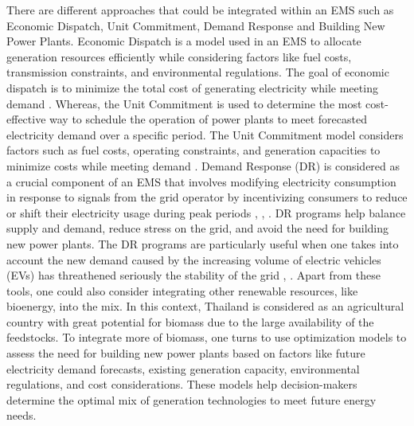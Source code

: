\documentclass[12pt]{report}
\begin{document}
There are different approaches that could be integrated within an EMS such as Economic Dispatch, Unit Commitment, Demand Response and Building New Power Plants. 
Economic Dispatch is a model used in an EMS to allocate generation resources efficiently while considering factors like fuel costs, transmission constraints, and environmental regulations. 
The goal of economic dispatch is to minimize the total cost of generating electricity while meeting demand \cite{Li2022123678}. 
Whereas, the Unit Commitment is used to determine the most cost-effective way to schedule the operation of power plants to meet forecasted electricity demand over a specific period. 
The Unit Commitment model considers factors such as fuel costs, operating constraints, and generation capacities to minimize costs while meeting demand \cite{abdou2018}. 
Demand Response (DR) is considered as a crucial component of an EMS that involves modifying electricity consumption in response to signals from the grid operator by incentivizing consumers to reduce or shift their electricity usage during peak periods \cite{OCONNELL2014686}, \cite{BLASCHKE2022112878}, \cite{HOFMANN2024100126}.
DR programs help balance supply and demand, reduce stress on the grid, and avoid the need for building new power plants.
The DR programs are particularly useful when one takes into account the new demand caused by the increasing volume of electric vehicles (EVs) has threathened seriously the stability of the grid \cite{TUNGOM2024121761}, \cite{SANKARAKUMAR2024112667}.
Apart from these tools, one could also consider integrating other renewable resources, like bioenergy, into the mix.
In this context, Thailand is considered as an agricultural country with great potential for biomass due to the large availability of the feedstocks.
To integrate more of biomass, one turns to use optimization models to assess the need for building new power plants based on factors like future electricity demand forecasts, existing generation capacity, environmental regulations, and cost considerations. 
These models help decision-makers determine the optimal mix of generation technologies to meet future energy needs.
\end{document}
